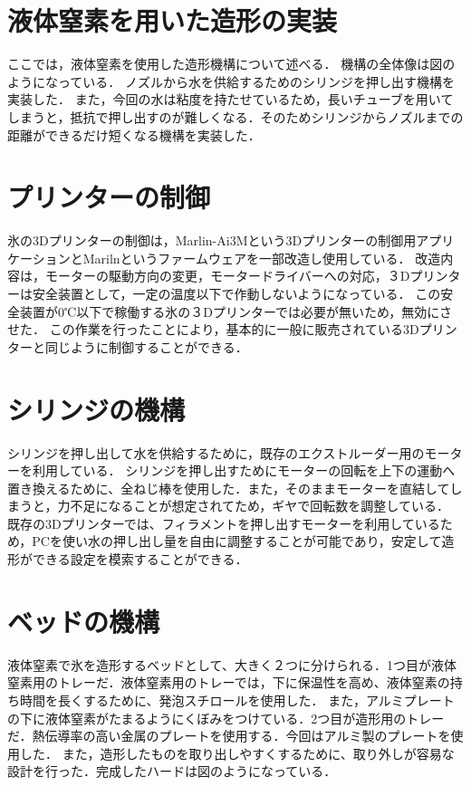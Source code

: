 \section{液体窒素を用いた造形の実装}
\label{sec:paragraph}
ここでは，液体窒素を使用した造形機構について述べる．
機構の全体像は図のようになっている．
ノズルから水を供給するためのシリンジを押し出す機構を実装した．
また，今回の水は粘度を持たせているため，長いチューブを用いてしまうと，抵抗で押し出すのが難しくなる．そのためシリンジからノズルまでの距離ができるだけ短くなる機構を実装した．

\section{プリンターの制御}
\label{sec:paragraph}
氷の3Dプリンターの制御は，Marlin-Ai3Mという3Dプリンターの制御用アプリケーションとMarilnというファームウェアを一部改造し使用している．
改造内容は，モーターの駆動方向の変更，モータードライバーへの対応，３Dプリンターは安全装置として，一定の温度以下で作動しないようになっている．
この安全装置が0℃以下で稼働する氷の３Dプリンターでは必要が無いため，無効にさせた．
この作業を行ったことにより，基本的に一般に販売されている3Dプリンターと同じように制御することができる．

\section{シリンジの機構}
\label{sec:paragraph}
シリンジを押し出して水を供給するために，既存のエクストルーダー用のモーターを利用している．
シリンジを押し出すためにモーターの回転を上下の運動へ置き換えるために、全ねじ棒を使用した．また，そのままモーターを直結してしまうと，力不足になることが想定されてため，ギヤで回転数を調整している．
既存の3Dプリンターでは、フィラメントを押し出すモーターを利用しているため，PCを使い水の押し出し量を自由に調整することが可能であり，安定して造形ができる設定を模索することができる．

\section{ベッドの機構}
\label{sec:paragraph}
液体窒素で氷を造形するベッドとして、大きく２つに分けられる．1つ目が液体窒素用のトレーだ．液体窒素用のトレーでは，下に保温性を高め、液体窒素の持ち時間を長くするために、発泡スチロールを使用した．
また，アルミプレートの下に液体窒素がたまるようにくぼみをつけている．2つ目が造形用のトレーだ．熱伝導率の高い金属のプレートを使用する．今回はアルミ製のプレートを使用した．
また，造形したものを取り出しやすくするために、取り外しが容易な設計を行った．完成したハードは図のようになっている．


